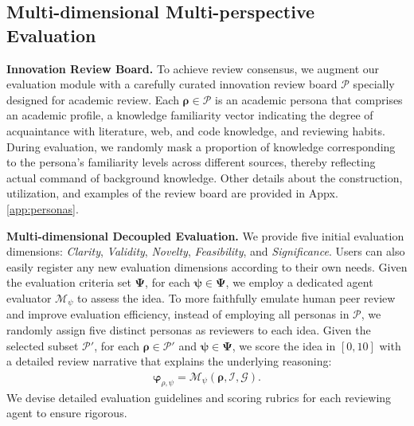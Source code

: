 \subsection{Multi-dimensional Multi-perspective Evaluation}
\label{sec:evaluation}
\textbf{Innovation Review Board.}
To achieve review consensus, we augment our evaluation module with a carefully curated innovation review board $\boldsymbol{\mathcal{P}}$ specially designed for academic review.
Each $\boldsymbol{\rho}\in\boldsymbol{\mathcal{P}}$ is an academic persona that comprises an academic profile, a knowledge familiarity vector indicating the degree of acquaintance with literature, web, and code knowledge, and reviewing habits.
During evaluation, we randomly mask a proportion of knowledge corresponding to the persona's familiarity levels across different sources, thereby reflecting actual command of background knowledge.
Other details about the construction, utilization, and examples of the review board are provided in Appx.\ref{app:personas}.

\textbf{Multi-dimensional Decoupled Evaluation.}
We provide five initial evaluation dimensions: \textit{Clarity}, \textit{Validity}, \textit{Novelty}, \textit{Feasibility}, and \textit{Significance}.
Users can also easily register any new evaluation dimensions according to their own needs.
Given the evaluation criteria set $\boldsymbol{\Psi}$, for each $\boldsymbol{\psi}\in\boldsymbol{\Psi}$, we employ a dedicated agent evaluator $\boldsymbol{\mathcal{M}}_{\psi}$ to assess the idea.
To more faithfully emulate human peer review and improve evaluation efficiency, instead of employing all personas in $\boldsymbol{\mathcal{P}}$, we randomly assign five distinct personas as reviewers to each idea.
Given the selected subset $\boldsymbol{\mathcal{P}}'$, for each $\boldsymbol{\rho}\in\boldsymbol{\mathcal{P}}'$ and $\boldsymbol{\psi}\in\boldsymbol{\Psi}$, we score the idea in $[0,10]$ with a detailed review narrative that explains the underlying reasoning:
\begin{align}
    \boldsymbol{\varphi}_{\rho,\psi}=\boldsymbol{\mathcal{M}}_{\psi}(\boldsymbol{\rho},\boldsymbol{\mathcal{I}},\boldsymbol{\mathcal{G}}).
\end{align}
We devise detailed evaluation guidelines and scoring rubrics for each reviewing agent to ensure rigorous.

